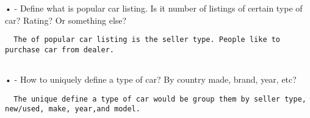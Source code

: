 \documentclass[
]{article}
\begin{document}
• - Define what is popular car listing. Is it number of listings of
certain type of car? Rating? Or something else?

\begin{verbatim}
  The of popular car listing is the seller type. People like to purchase car from dealer. 
  
\end{verbatim}

• - How to uniquely define a type of car? By country made, brand, year,
etc?

\begin{verbatim}
  The unique define a type of car would be group them by seller type, new/used, make, year,and model.
\end{verbatim}
\end{document}
